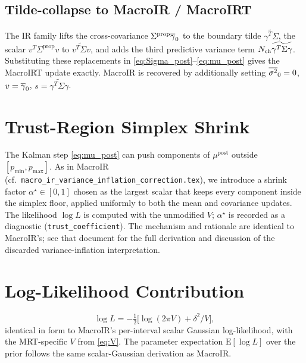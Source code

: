 \documentclass[11pt]{article}
\begin{document}
\subsection{Tilde-collapse to MacroIR / MacroIRT}

The IR family lifts the cross-covariance $\Sigma^{\mathrm{prop}}\overline{\gamma}_0$
to the boundary tilde $\widetilde{\gamma^{T}\Sigma}$, the scalar
$v^{T}\Sigma^{\mathrm{prop}}v$ to $\widetilde{v^{T}\Sigma v}$, and adds
the third predictive variance term $N_{\mathrm{ch}}\widetilde{\gamma^{T}\Sigma\gamma}$.
Substituting these replacements in
\eqref{eq:Sigma_post}--\eqref{eq:mu_post} gives the MacroIRT update
exactly. MacroIR is recovered by additionally setting $\overline{\sigma^2}_0=0$,
$v=\overline{\gamma}_0$, $s=\widetilde{\gamma^{T}\Sigma\gamma}$.

\section{Trust-Region Simplex Shrink}

The Kalman step \eqref{eq:mu_post} can push components of
$\mu^{\mathrm{post}}$ outside $[p_{\min},p_{\max}]$. As in MacroIR
(cf.\ \texttt{macro\_ir\_variance\_inflation\_correction.tex}), we
introduce a shrink factor $\alpha^\star\in[0,1]$ chosen as the largest
scalar that keeps every component inside the simplex floor, applied
uniformly to both the mean and covariance updates. The likelihood
$\log L$ is computed with the unmodified $V$; $\alpha^\star$ is
recorded as a diagnostic (\texttt{trust\_coefficient}). The mechanism
and rationale are identical to MacroIR's; see that document for the
full derivation and discussion of the discarded variance-inflation
interpretation.

\section{Log-Likelihood Contribution}

\begin{equation}
  \log L = -\tfrac{1}{2}\bigl[\log(2\pi V) + \delta^2/V\bigr],
  \label{eq:logL}
\end{equation}
identical in form to MacroIR's per-interval scalar Gaussian
log-likelihood, with the MRT-specific $V$ from \eqref{eq:V}. The
parameter expectation $\mathrm{E}[\log L]$ over the prior follows the
same scalar-Gaussian derivation as MacroIR.
\end{document}
